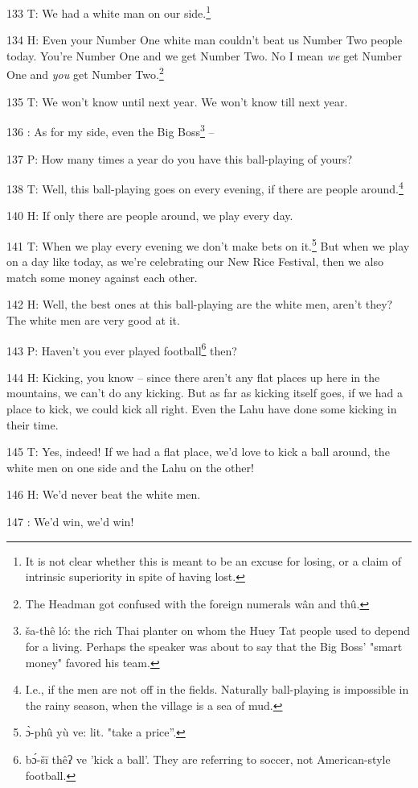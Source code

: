 133 T: We had a white man on our side.\footnote{It is not clear whether this is meant to be an excuse for losing, or a claim of intrinsic superiority in spite of having lost.}

134 H: Even your Number One white man couldn't beat us Number Two people today.
You're Number One and we get Number Two. No I mean \textit{we} get Number One and
\textit{you} get Number Two.\footnote{The Headman got confused with the foreign numerals wân and thû.}

135 T: We won't know until next year. We won't know till next year.

136 : As for my side, even the Big Boss\footnote{ša-thê ló: the rich Thai planter on whom the Huey Tat people used to depend for a living. Perhaps the speaker was about to say that the Big Boss' "smart money" favored his team.} --

137 P: How many times a year do you have this ball-playing of yours?

138 T: Well, this ball-playing goes on every evening, if there are people around.\footnote{I.e., if the men are not off in the fields. Naturally ball-playing is impossible in the rainy season, when the village is a sea of mud.}

140 H: If only there are people around, we play every day.

141 T: When we play every evening we don't make bets on it.\footnote{ɔ̀-phû yù ve: lit. "take a price''.} But when we play
on a day like today, as we're celebrating our New Rice Festival, then we also match
some money against each other.

142 H: Well, the best ones at this ball-playing are the white men, aren't they?
The white men are very good at it.

143 P: Haven't you ever played football\footnote{bɔ́-šī thêʔ ve 'kick a ball'. They are referring to soccer, not American-style football.} then?

144 H: Kicking, you know -- since there aren't any flat places up here in the mountains,
we can't do any kicking. But as far as kicking itself goes, if we had a place to
kick, we could kick all right. Even the Lahu have done some kicking in their time.

145 T: Yes, indeed! If we had a flat place, we'd love to kick a ball around, the
white men on one side and the Lahu on the other!

146 H: We'd never beat the white men.

147 : We'd win, we'd win!

